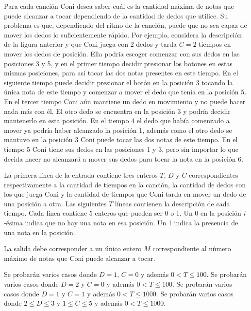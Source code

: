 \documentclass{oci}
\begin{document}
\begin{problemDescription}
  Para cada canción Coni desea saber cuál es la cantidad máxima de notas que
  puede alcanzar a tocar dependiendo de la cantidad de dedos que utilice.
  Su problema es que, dependiendo del ritmo de la canción, puede que no sea
  capaz de mover los dedos lo suficientemente rápido.
  Por ejemplo, considera la descripción de la figura anterior y que Coni juega
  con 2 dedos y tarda $C=2$ tiempos en mover los dedos de posición.
  Ella podría escoger comenzar con sus dedos en las posiciones 3 y 5, y en el
  primer tiempo decidir presionar los botones en estas mismas posiciones, para así
  tocar las dos notas presentes en este tiempo.
  En el siguiente tiempo puede decidir presionar el botón en la posición 3
  tocando la única nota de este tiempo y comenzar a mover el dedo que
  tenía en la posición 5.
  En el tercer tiempo Coni aún mantiene un dedo en movimiento y no puede hacer nada
  más con él.
  El otro dedo se encuentra en la posición 3 y podría decidir mantenerlo en esta
  posición.
  En el tiempo 4 el dedo que había comenzado a mover ya podría haber alcanzado
  la posición 1, además como el otro dedo se mantuvo en la posición 3 Coni puede
  tocar las dos notas de este tiempo.
  En el tiempo 5 Coni tiene sus dedos en las posiciones 1 y 3, pero sin importar
  lo que decida hacer no alcanzará a mover sus dedos para tocar la nota en la
  posición 6.
\end{problemDescription}
\begin{inputDescription}
  La primera línea de la entrada contiene tres enteros $T$, $D$ y $C$
  correspondientes respectivamente a la cantidad de tiempos en la canción, la
  cantidad de dedos con los que juega Coni y la cantidad de tiempos que Coni
  tarda en mover un dedo de una posición a otra.
  Las siguientes $T$ líneas contienen la descripción de cada tiempo.
  Cada línea contiene 5 enteros que pueden ser 0 o 1.
  Un 0 en la posición $i$-ésima indica que no hay una nota en esa posición.
  Un 1 indica la presencia de una nota en la posición.
\end{inputDescription}

\begin{outputDescription}
  La salida debe corresponder a un único entero $M$ correspondiente al número
  máximo de notas que Coni puede alcanzar a tocar.
\end{outputDescription}

\begin{scoreDescription}
   Se probarán varios casos donde $D = 1$, $C = 0$ y además $0 < T \le 100$.
   Se probarán varios casos donde $D = 2$ y $C = 0$ y además $0 < T \le 100$.
   Se probarán varios casos donde $D = 1$ y $C = 1$ y además $0 < T \le 1000$.
   Se probarán varios casos donde $2 \le D \le 3$ y $1 \le C \le 5$ y
  además $0 < T \le 1000$.
\end{scoreDescription}

\begin{sampleDescription}
\end{sampleDescription}
\end{document}
